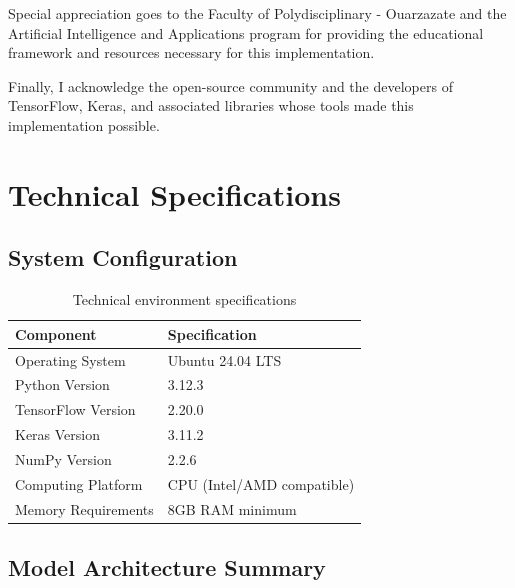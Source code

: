 \documentclass[11pt,a4paper]{article}
\begin{document}
Special appreciation goes to the Faculty of Polydisciplinary - Ouarzazate and the Artificial Intelligence and Applications program for providing the educational framework and resources necessary for this implementation.

Finally, I acknowledge the open-source community and the developers of TensorFlow, Keras, and associated libraries whose tools made this implementation possible.

\appendix

\section{Technical Specifications}

\subsection{System Configuration}

\begin{table}[H]
\centering
\begin{tabularx}{0.8\textwidth}{Xl}
\toprule
\textbf{Component} & \textbf{Specification} \\
\midrule
Operating System & Ubuntu 24.04 LTS \\
Python Version & 3.12.3 \\
TensorFlow Version & 2.20.0 \\
Keras Version & 3.11.2 \\
NumPy Version & 2.2.6 \\
Computing Platform & CPU (Intel/AMD compatible) \\
Memory Requirements & 8GB RAM minimum \\
\bottomrule
\end{tabularx}
\caption{Technical environment specifications}
\end{table}

\subsection{Model Architecture Summary}
\end{document}
